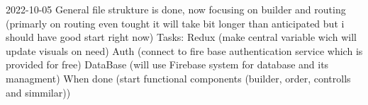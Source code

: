 2022-10-05 General file strukture is done, now focusing on builder and routing (primarly on routing even tought it will take bit longer than anticipated but i should have good start right now)
Tasks: 
    Redux (make central variable wich will update visuals on need)
    Auth (connect to fire base authentication service which is provided for free)
    DataBase (will use Firebase system for database and its managment)
    {When done (start functional components (builder, order, controlls and simmilar))} 